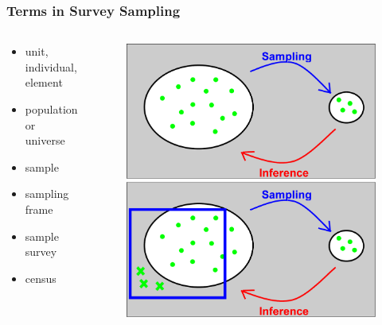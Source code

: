 \documentclass[10pt, compress]{beamer}
\begin{document}
\begin{frame}
    \frametitle{Terms in Survey Sampling}
    \begin{columns}
        \begin{block}{}
            \begin{itemize}
                \item unit, individual, element
                \item population or universe
                \item sample
                \item sampling frame
                \item sample survey
                \item census
            \end{itemize}
        \end{block}
        \begin{block}{}
            \begin{figure}
                \begin{center}
                    \includegraphics[scale=0.1]{img/PopulationFrame.png}
                \end{center}
            \end{figure}
        \end{block}
    \end{columns}
\end{frame}
\end{document}
